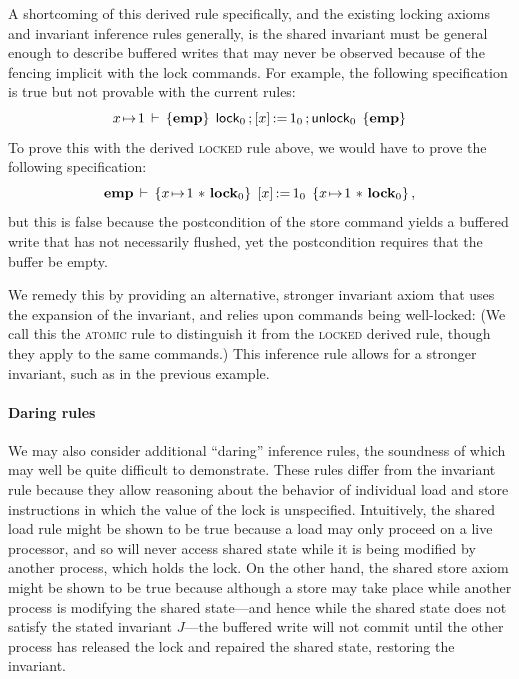 \documentclass[11pt]{report}
\begin{document}
A shortcoming of this derived rule specifically, and the existing locking axioms and invariant inference rules generally, is the shared invariant must be general enough to describe buffered writes that may never be observed because of the fencing implicit with the lock commands. For example, the following specification is true but not provable with the current rules:     \[ x \!\mapsto\! 1\,\vdash\,\left\lbrace \mathbf{emp} \right\rbrace\;\operatorname{\mathsf{lock}}_0 \operatorname{;} \left[ x \right] \operatorname{:\!=} 1_0 \operatorname{;} \operatorname{\mathsf{unlock}}_0\;\left\lbrace \mathbf{emp} \right\rbrace \] To prove this with the derived \textsc{locked} rule above, we would have to prove the following specification: \[ \mathbf{emp}\,\vdash\,\left\lbrace x \!\mapsto\! 1 \operatorname{\,\ast\,} \mathbf{lock}_{0} \right\rbrace\;\left[ x \right] \operatorname{:\!=} 1_0\;\left\lbrace x \!\mapsto\! 1 \operatorname{\,\ast\,} \mathbf{lock}_{0} \right\rbrace,\] but this is false because the postcondition of the store command yields a buffered write that has not necessarily flushed, yet the postcondition requires that the buffer be empty. 

We remedy this by providing an alternative, stronger invariant axiom that uses the expansion of the invariant, and relies upon commands being well-locked:  (We call this the \textsc{atomic} rule to distinguish it from the \textsc{locked} derived rule, though they apply to the same commands.) This inference rule allows for a stronger invariant, such as in the previous example.
 


\paragraph{Daring rules} We may also consider additional ``daring'' inference rules, the soundness of which may well be quite difficult to demonstrate. 
These rules differ from the invariant rule because they allow reasoning about the behavior of individual load and store instructions in which the value of the lock is unspecified. Intuitively, the shared load rule might be shown to be true because a load may only proceed on a live processor, and so will never access shared state while it is being modified by another process, which holds the lock. On the other hand, the shared store axiom might be shown to be true because although a store may take place while another process is modifying the shared state---and hence while the shared state does not satisfy the stated invariant $J$---the buffered write will not commit until the other process has released the lock and repaired the shared state, restoring the invariant.
\end{document}
